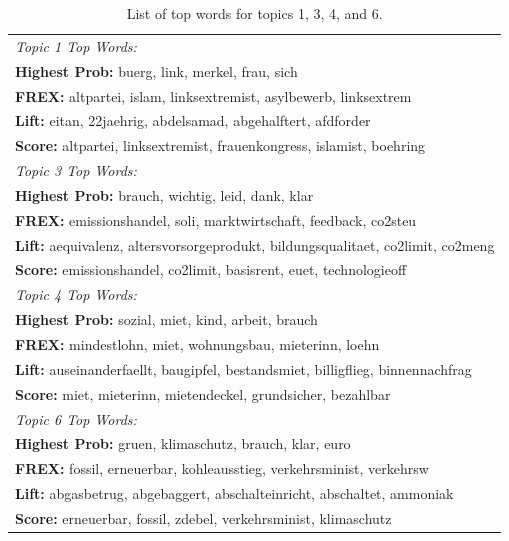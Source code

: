 \begin{table}[h!]
\centering
\captionsetup{justification=centering,margin=2cm}
\begin{tabular}{|l|}
\hline
\textit{Topic 1 Top Words:}\\
 	 \textbf{Highest Prob:} buerg, link, merkel, frau, sich \\
 	 \textbf{FREX:} altpartei, islam, linksextremist, asylbewerb, linksextrem \\
 	 \textbf{Lift:} eitan, 22jaehrig, abdelsamad, abgehalftert, afdforder \\
 	 \textbf{Score:} altpartei, linksextremist, frauenkongress, islamist, boehring \\
\hline
\textit{Topic 3 Top Words:}\\
 	 \textbf{Highest Prob:} brauch, wichtig, leid, dank, klar \\
 	 \textbf{FREX:} emissionshandel, soli, marktwirtschaft, feedback, co2steu \\
 	 \textbf{Lift:} aequivalenz, altersvorsorgeprodukt, bildungsqualitaet, co2limit, co2meng \\
 	 \textbf{Score:} emissionshandel, co2limit, basisrent, euet, technologieoff \\
\hline
\textit{Topic 4 Top Words:}\\
 	 \textbf{Highest Prob:} sozial, miet, kind, arbeit, brauch \\
 	 \textbf{FREX:} mindestlohn, miet, wohnungsbau, mieterinn, loehn \\
 	 \textbf{Lift:} auseinanderfaellt, baugipfel, bestandsmiet, billigflieg, binnennachfrag \\
 	 \textbf{Score:} miet, mieterinn, mietendeckel, grundsicher, bezahlbar \\
\hline
\textit{Topic 6 Top Words:}\\
 	 \textbf{Highest Prob:} gruen, klimaschutz, brauch, klar, euro \\
 	 \textbf{FREX:} fossil, erneuerbar, kohleausstieg, verkehrsminist, verkehrsw \\
 	 \textbf{Lift:} abgasbetrug, abgebaggert, abschalteinricht, abschaltet, ammoniak \\ 
 	 \textbf{Score:} erneuerbar, fossil, zdebel, verkehrsminist, klimaschutz \\
\hline
\end{tabular}
\caption{List of top words for topics 1, 3, 4, and 6.}
\label{tab:top_words_1346}
\end{table}

